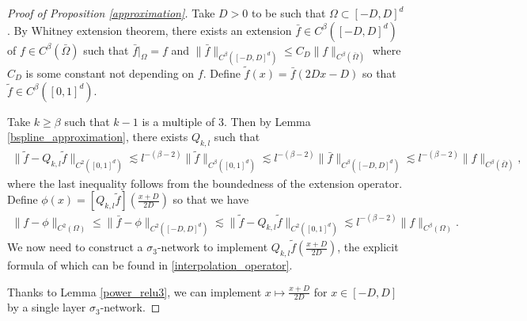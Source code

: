 \documentclass{article}
\theoremstyle{plain}
\theoremstyle{definition}
\theoremstyle{remark}
\begin{document}
\begin{proof}[Proof of Proposition \ref{approximation}]
Take $D > 0$ to be such that $\Omega \subset [-D, D]^d$.
By Whitney extension theorem, there exists an extension $\bar{f} \in C^{\beta}([-D, D]^d)$ of $f \in C^\beta(\bar{\Omega})$ such that $\bar{f}|_{\Omega} = f$ and $\|\bar{f}\|_{C^\beta([-D, D]^d)} \leq C_D \|f\|_{C^\beta(\bar{\Omega})}$ where $C_D$ is some constant not depending on $f$. Define $\tilde{f}(x) = \bar{f}(2Dx - D)$ so that $\tilde{f} \in C^{\beta}([0,1]^d)$. 

Take $k \geq \beta$ such that $k-1$ is a multiple of $3$. Then by Lemma \ref{bspline_approximation}, there exists $Q_{k, l}$ such that
    \begin{align*}
        \|\tilde{f} - Q_{k, l} \tilde{f}\|_{C^{2}([0, 1]^d)} \lesssim l^{-(\beta-2)} \|\tilde{f}\|_{C^{\beta}([0,1]^d)} \lesssim  l^{-(\beta-2)} \|\bar{f}\|_{C^\beta([-D, D]^d)} \lesssim  l^{-(\beta-2)} \|f\|_{C^\beta(\bar{\Omega})},
    \end{align*}
    where the last inequality follows from the boundedness of the extension operator.
Define $\phi(x) = [Q_{k, l} \tilde{f}](\frac{x + D}{2D})$ so that we have
\begin{align*}
   \|f - \phi\|_{C^2(\Omega)} \leq \|\bar{f} - \phi\|_{C^{2}([-D, D]^d)} \lesssim  \|\tilde{f} - Q_{k, l} \tilde{f}\|_{C^{2}([0, 1]^d)} \lesssim   l^{-(\beta-2)} \|f\|_{C^\beta(\Omega)}. 
\end{align*}
    We now need to construct a $\sigma_3$-network to implement $Q_{k, l} \tilde{f}(\frac{x + D}{2D})$, the explicit formula of which can be found in \eqref{interpolation_operator}. 

    Thanks to Lemma \ref{power_relu3}, we can implement $x \mapsto \frac{x + D}{2D}$ for $x \in [-D, D]$ by a single layer $\sigma_3$-network. 
    

\end{proof}
\end{document}
